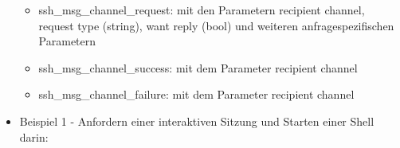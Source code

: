 \documentclass[a4paper]{article}
\begin{document}
\begin{multicols}{3}
\begin{itemize}
              \begin{itemize}
                  \item
                        ssh\_msg\_channel\_request: mit den Parametern recipient channel,
                        request type (string), want reply (bool) und weiteren
                        anfragespezifischen Parametern
                  \item
                        ssh\_msg\_channel\_success: mit dem Parameter recipient channel
                  \item
                        ssh\_msg\_channel\_failure: mit dem Parameter recipient channel
              \end{itemize}
        \item
              Beispiel 1 - Anfordern einer interaktiven Sitzung und Starten einer
              Shell darin:


\end{itemize}
\end{multicols}
\end{document}
